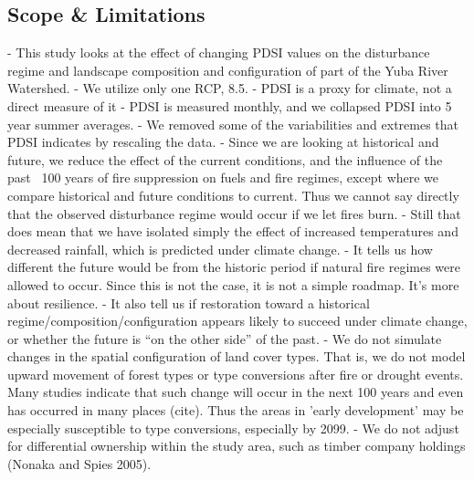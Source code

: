 \documentclass[12pt]{article}
\begin{document}
\begin{spacing}{1}
\subsection*{Scope \& Limitations}
- This study looks at the effect of changing PDSI values on the disturbance regime and landscape composition and configuration of part of the Yuba River Watershed. 
- We utilize only one RCP, 8.5.
- PDSI is a proxy for climate, not a direct measure of it
- PDSI is measured monthly, and we collapsed PDSI into 5 year summer averages.
- We removed some of the variabilities and extremes that PDSI indicates by rescaling the data.
- Since we are looking at historical and future, we reduce the effect of the current conditions, and the influence of the past ~100 years of fire suppression on fuels and fire regimes, except where we compare historical and future conditions to current. Thus we cannot say directly that the observed disturbance regime would occur if we let fires burn.
- Still that does mean that we have isolated simply the effect of increased temperatures and decreased rainfall, which is predicted under climate change.
- It tells us how different the future would be from the historic period if natural fire regimes were allowed to occur. Since this is not the case, it is not a simple roadmap. It's more about resilience. 
- It also tell us if restoration toward a historical regime/composition/configuration appears likely to succeed under climate change, or whether the future is ``on the other side'' of the past.
- We do not simulate changes in the spatial configuration of land cover types. That is, we do not model upward movement of forest types or type conversions after fire or drought events. Many studies indicate that such change will occur in the next 100 years and even has occurred in many places (cite). Thus the areas in 'early development' may be especially susceptible to type conversions, especially by 2099.
- We do not adjust for differential ownership within the study area, such as timber company holdings (Nonaka and Spies 2005).



% 
% 

\end{spacing}
\end{document}
